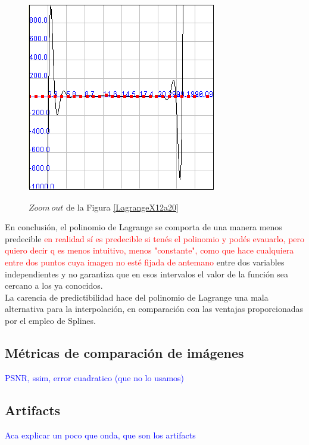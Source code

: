 \documentclass[a4paper]{article}
\begin{document}
\begin{figure}
	\caption{$Zoom \ out$ de la Figura \ref{LagrangeX12a20}}
	\begin{center}
	\includegraphics[scale=1]{imagenes/LagrangeX12a20(zoomOut)}
	\label{LagrangeX12a20(zoomOut)}
  \end{center}
\end{figure}


En conclusión, el polinomio de Lagrange se comporta de una manera menos predecible \textcolor{red}{en realidad sí es predecible si tenés el polinomio y podés evauarlo, pero quiero decir q es menos intuitivo, menos "constante", como que hace cualquiera entre dos puntos cuya imagen no esté fijada de antemano} entre dos variables independientes y no garantiza que en esos intervalos el valor de la función sea cercano a los ya conocidos.\\
La carencia de predictibilidad hace del polinomio de Lagrange una mala alternativa para la interpolación, en comparación con las ventajas proporcionadas por el empleo de Splines.\\


\newpage
\subsection{M\'etricas de comparaci\'on de im\'agenes}

\textcolor{blue}{PSNR, ssim, error cuadratico (que no lo usamos)}

\subsection{Artifacts}
\textcolor{blue}{Aca explicar un poco que onda,  que son los artifacts}
\end{document}
